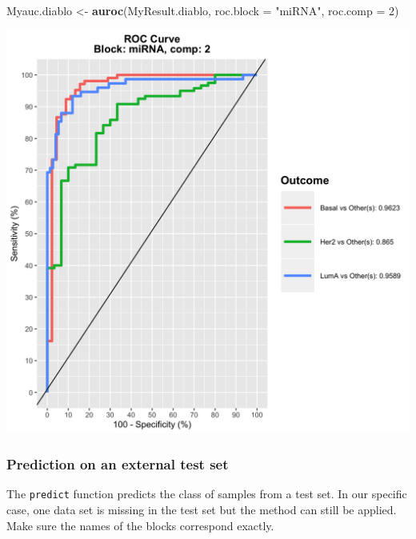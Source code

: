 \documentclass[]{book}
\newenvironment{Shaded}{\begin{snugshade}}{\end{snugshade}}
\newcommand{\CommentTok}[1]{\textcolor[rgb]{0.56,0.35,0.01}{\textit{#1}}}
\newcommand{\DataTypeTok}[1]{\textcolor[rgb]{0.13,0.29,0.53}{#1}}
\newcommand{\DecValTok}[1]{\textcolor[rgb]{0.00,0.00,0.81}{#1}}
\newcommand{\KeywordTok}[1]{\textcolor[rgb]{0.13,0.29,0.53}{\textbf{#1}}}
\newcommand{\NormalTok}[1]{#1}
\newcommand{\OperatorTok}[1]{\textcolor[rgb]{0.81,0.36,0.00}{\textbf{#1}}}
\newcommand{\StringTok}[1]{\textcolor[rgb]{0.31,0.60,0.02}{#1}}
\begin{document}
\begin{Shaded}
\begin{Highlighting}[]
\NormalTok{Myauc.diablo <-}\StringTok{ }\KeywordTok{auroc}\NormalTok{(MyResult.diablo, }\DataTypeTok{roc.block =} \StringTok{"miRNA"}\NormalTok{, }\DataTypeTok{roc.comp =} \DecValTok{2}\NormalTok{)}
\end{Highlighting}
\end{Shaded}

\begin{center}\includegraphics[width=0.75\linewidth,]{Figures/06-auroc-1} \end{center}

\hypertarget{prediction-on-an-external-test-set}{%
\subsubsection{Prediction on an external test set}\label{prediction-on-an-external-test-set}}

The \texttt{predict} function predicts the class of samples from a test set. In our specific case, one data set is missing in the test set but the method can still be applied. Make sure the names of the blocks correspond exactly.

\begin{Shaded}
\end{Shaded}
\end{document}
